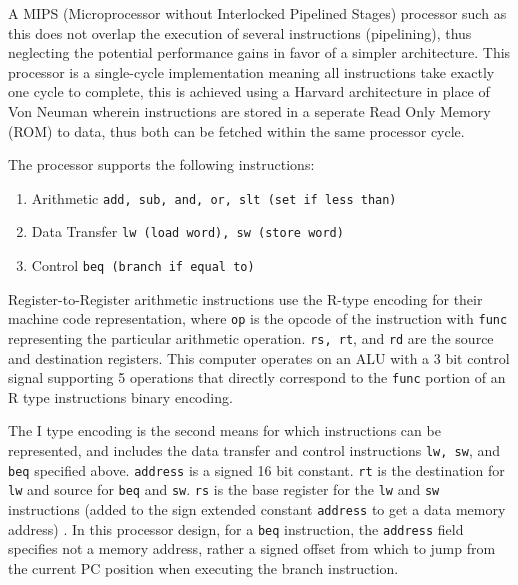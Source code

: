 A MIPS (Microprocessor without Interlocked Pipelined Stages) processor such as this does not overlap the execution of several instructions (pipelining), thus neglecting the potential performance gains in favor of a simpler architecture. This processor is a single-cycle implementation meaning all instructions take exactly one cycle to complete, this is achieved using a Harvard architecture in place of Von Neuman wherein instructions are stored in a seperate Read Only Memory (ROM) to data, thus both can be fetched within the same processor cycle. 

The processor supports the following instructions:
\begin{enumerate}
    \item Arithmetic \texttt{add, sub, and, or, slt (set if less than)}
    \item Data Transfer \texttt{lw (load word), sw (store word)}
    \item Control \texttt{beq (branch if equal to)}
\end{enumerate} 
Register-to-Register arithmetic instructions use the R-type encoding for their machine code representation, where \texttt{op} is the opcode of the instruction with \texttt{func} representing the particular arithmetic operation. \texttt{rs, rt}, and \texttt{rd} are the source and destination registers. This computer operates on an ALU with a 3 bit control signal supporting 5 operations that directly correspond to the \texttt{func} portion of an R type instructions binary encoding. 

\bigskip


\bigskip

The I type encoding is the second means for which instructions can be represented, and includes the data transfer and control instructions \texttt{lw, sw}, and \texttt{beq} specified above. \texttt{address} is a signed 16 bit constant. \texttt{rt} is the destination for \texttt{lw} and source for \texttt{beq} and \texttt{sw}. \texttt{rs} is the base register for the \texttt{lw} and \texttt{sw} instructions (added to the sign extended constant \texttt{address} to get a data memory address) \textcite{MIPS-uw}. In this processor design, for a \texttt{beq} instruction, the \texttt{address} field specifies not a memory address, rather a signed offset from which to jump from the current PC position when executing the branch instruction.


